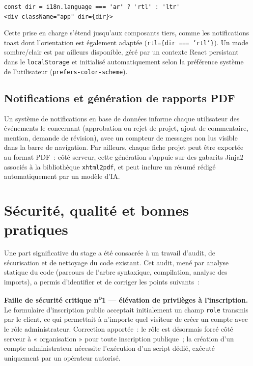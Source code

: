 \documentclass[11pt,a4paper]{report}
\begin{document}
\begin{lstlisting}
const dir = i18n.language === 'ar' ? 'rtl' : 'ltr'
<div className="app" dir={dir}>
\end{lstlisting}

Cette prise en charge s'étend jusqu'aux composants tiers, comme les notifications toast dont l'orientation
est également adaptée (\texttt{rtl=\{dir === 'rtl'\}}). Un mode sombre/clair est par ailleurs disponible,
géré par un contexte React persistant dans le \texttt{localStorage} et initialisé automatiquement selon la
préférence système de l'utilisateur (\texttt{prefers-color-scheme}).

\section{Notifications et génération de rapports PDF}

Un système de notifications en base de données informe chaque utilisateur des événements le concernant
(approbation ou rejet de projet, ajout de commentaire, mention, demande de révision), avec un compteur de
messages non lus visible dans la barre de navigation. Par ailleurs, chaque fiche projet peut être exportée
au format PDF~: côté serveur, cette génération s'appuie sur des gabarits Jinja2 associés à la bibliothèque
\texttt{xhtml2pdf}, et peut inclure un résumé rédigé automatiquement par un modèle d'IA.

\chapter{Sécurité, qualité et bonnes pratiques}

Une part significative du stage a été consacrée à un travail d'audit, de sécurisation et de nettoyage du
code existant. Cet audit, mené par analyse statique du code (parcours de l'arbre syntaxique, compilation,
analyse des imports), a permis d'identifier et de corriger les points suivants~:

\begin{warnbox}
\textbf{Faille de sécurité critique n\textsuperscript{o}1 --- élévation de privilèges à l'inscription.} Le
formulaire d'inscription public acceptait initialement un champ \texttt{role} transmis par le client, ce qui
permettait à n'importe quel visiteur de créer un compte avec le rôle administrateur. Correction apportée~:
le rôle est désormais forcé côté serveur à « organisation » pour toute inscription publique~; la création
d'un compte administrateur nécessite l'exécution d'un script dédié, exécuté uniquement par un opérateur
autorisé.
\end{warnbox}
\end{document}
